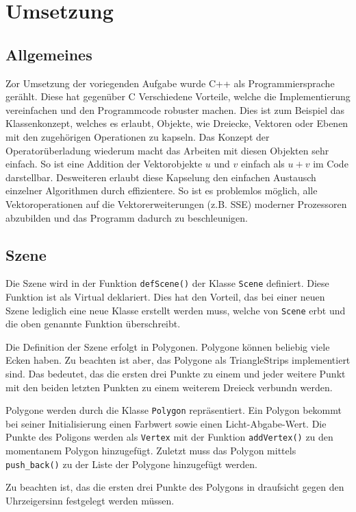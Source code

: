 \documentclass[final,a4paper,11pt,notitlepage,halfparskip]{scrreprt}
\begin{document}
\chapter{Umsetzung}
\section{Allgemeines}
Zor Umsetzung der voriegenden Aufgabe wurde C++ als Programmiersprache gerählt.
Diese hat gegenüber C Verschiedene Vorteile, welche die Implementierung
vereinfachen und den Programmcode robuster machen. Dies ist zum Beispiel das
Klassenkonzept, welches es erlaubt, Objekte, wie Dreiecke, Vektoren oder Ebenen
mit den zugehörigen Operationen zu kapseln. Das Konzept der Operatorüberladung
wiederum macht das Arbeiten mit diesen Objekten sehr einfach. So ist eine
Addition der Vektorobjekte $u$ und $v$ einfach als $u+v$ im Code darstellbar.
Desweiteren erlaubt diese Kapselung den einfachen Austausch einzelner
Algorithmen durch effizientere. So ist es problemlos möglich, alle
Vektoroperationen auf die Vektorerweiterungen (z.B. SSE) moderner Prozessoren 
abzubilden und das Programm dadurch zu beschleunigen.

\section{Szene}
Die Szene wird in der Funktion \texttt{defScene()} der Klasse \texttt{Scene}
definiert. Diese Funktion ist als Virtual deklariert. Dies hat den Vorteil, das
bei einer neuen Szene lediglich eine neue Klasse erstellt werden muss, welche
von \texttt{Scene} erbt und die oben genannte Funktion überschreibt.

Die Definition der Szene erfolgt in Polygonen. Polygone können beliebig viele
Ecken haben. Zu beachten ist aber, das Polygone als TriangleStrips implementiert
sind. Das bedeutet, das die ersten drei Punkte zu einem und jeder weitere Punkt 
mit den beiden letzten Punkten zu einem weiterem Dreieck verbundn werden.

Polygone werden durch die Klasse \texttt{Polygon} repräsentiert. Ein Polygon
bekommt bei seiner Initialisierung einen Farbwert sowie einen Licht-Abgabe-Wert.
Die Punkte des Poligons werden als \texttt{Vertex} mit der Funktion
\texttt{addVertex()} zu den momentanem Polygon hinzugefügt. Zuletzt muss das
Polygon mittels \texttt{push\_back()} zu der Liste der Polygone hinzugefügt
werden.

Zu beachten ist, das die ersten drei Punkte des Polygons in draufsicht gegen den
Uhrzeigersinn festgelegt werden müssen.
\end{document}
